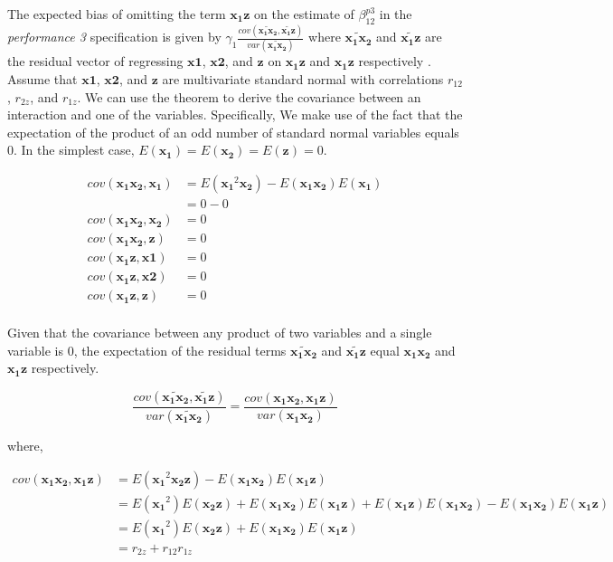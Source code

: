 \documentclass[12pt]{article}
\begin{document}
The expected bias of omitting the term $\mathbf{x_1 z}$ on the estimate of $\beta^{p3}_{12}$ in the \emph{performance 3} specification is given by $\gamma_1 \frac{cov(\widetilde{\mathbf{x_1 x_2}}, \widetilde{\mathbf{x_1 z}})} {var(\widetilde{\mathbf{x_1 x_2}})}$ \citep{chenhall_issue_2007} where $\widetilde{\mathbf{x_1 x_2}}$ and $\widetilde{\mathbf{x_1 z}}$ are the residual vector of regressing $\mathbf{x1}$, $\mathbf{x2}$, and $\mathbf{z}$ on $\mathbf{x_1 z}$ and $\mathbf{x_1 z}$ respectively \citep{angrist2008mostly,cunningham_causal_2018}. 
Assume that $\mathbf{x1}$, $\mathbf{x2}$, and $\mathbf{z}$ are multivariate standard normal with correlations $r_{12}$, $r_{2z}$, and $r_{1z}$. We can use the \citet{isserlis_formula_1918} theorem to derive the covariance between an interaction and one of the variables. Specifically, We make use of the fact that the expectation of the product of an odd number of standard normal variables equals 0. In the simplest case, $E(\mathbf{x_1}) =  E(\mathbf{x_2}) = E(\mathbf{z}) = 0$.

\begin{align*}
cov(\mathbf{x_1 x_2}, \mathbf{x_1}) &= E(\mathbf{x_1}^2 \mathbf{x_2}) - E(\mathbf{x_1 x_2}) E(\mathbf{x_1}) \\
&= 0 - 0 \\
cov(\mathbf{x_1 x_2}, \mathbf{x_2}) &= 0 \\
cov(\mathbf{x_1 x_2}, \mathbf{z}) &= 0 \\
cov(\mathbf{x_1 z}, \mathbf{x1}) &= 0 \\
cov(\mathbf{x_1 z}, \mathbf{x2}) &= 0 \\
cov(\mathbf{x_1 z}, \mathbf{z}) &= 0 \\
\end{align*}

Given that the covariance between any product of two variables and a single variable is $0$, the expectation of the residual terms $\widetilde{\mathbf{x_1 x_2}}$ and $\widetilde{\mathbf{x_1 z}}$ equal $\mathbf{x_1 x_2}$ and $\mathbf{x_1 z}$ respectively.

\begin{equation*}
\frac{cov(\widetilde{\mathbf{x_1 x_2}}, \widetilde{\mathbf{x_1 z}})}{var(\widetilde{\mathbf{x_1 x_2}})} =
\frac{cov(\mathbf{x_1 x_2}, \mathbf{x_1 z})}{var(\mathbf{x_1 x_2})} 
\end{equation*}

where,

\begin{align*}
cov(\mathbf{x_1 x_2}, \mathbf{x_1 z}) &= E(\mathbf{x_1}^2 \mathbf{x_2 z }) - E(\mathbf{x_1 x_2}) E(\mathbf{x_1 z}) \\
&= E(\mathbf{x_1}^2) E(\mathbf{x_2 z }) + E(\mathbf{x_1 x_2}) E(\mathbf{x_1 z}) + E(\mathbf{x_1 z}) E(\mathbf{x_1 x_2}) - E(\mathbf{x_1 x_2}) E(\mathbf{x_1 z}) \\
&= E(\mathbf{x_1}^2) E(\mathbf{x_2 z }) + E(\mathbf{x_1 x_2}) E(\mathbf{x_1 z}) \\
&= r_{2z} + r_{12} r_{1z}
\end{align*}
\end{document}
